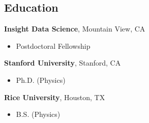 \documentclass[margin,line]{resume}
\begin{document}
\begin{resume}
    \section{\mysidestyle Education}
    \textbf{Insight Data Science}, Mountain View, CA %
    \begin{itemize}
    \item Postdoctoral Fellowship
    \end{itemize}\vspace{-1.5mm}

    \textbf{Stanford University}, Stanford, CA%
    \begin{itemize}
    \item Ph.D. (Physics)
    \end{itemize}\vspace{-1.5mm}

    \textbf{Rice University}, Houston, TX%
    \begin{itemize}
    \item B.S. (Physics)
    \end{itemize}\vspace{-1.5mm}





\end{resume}
\end{document}
